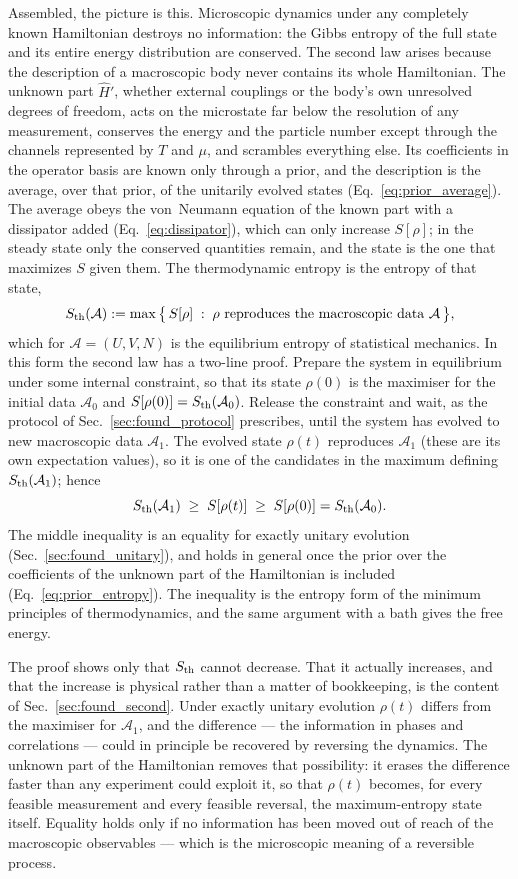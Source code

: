 \documentclass[10pt,a4paper]{article}
\begin{document}
Assembled, the picture is this.
Microscopic dynamics under any completely known Hamiltonian destroys no information: the Gibbs entropy of the full state and its entire energy distribution are conserved.
The second law arises because the description of a macroscopic body never contains its whole Hamiltonian.
The unknown part $ \hat H' $, whether external couplings or the body's own unresolved degrees of freedom, acts on the microstate far below the resolution of any measurement, conserves the energy and the particle number except through the channels represented by $ T $ and $ \mu $, and scrambles everything else.
Its coefficients in the operator basis are known only through a prior, and the description is the average, over that prior, of the unitarily evolved states (Eq.~\eqref{eq:prior_average}).
The average obeys the von~Neumann equation of the known part with a dissipator added (Eq.~\eqref{eq:dissipator}), which can only increase $ S[\rho] $; in the steady state only the conserved quantities remain, and the state is the one that maximizes $ S $ given them.
The thermodynamic entropy is the entropy of that state,
\[
  S_{\rm th}(\mathcal{A}) := \max\big\{\,S[\rho] \;:\; \rho \text{ reproduces the macroscopic data } \mathcal{A}\,\big\} ,
\]
which for $ \mathcal{A} = (U, V, N) $ is the equilibrium entropy of statistical mechanics.
In this form the second law has a two-line proof.
Prepare the system in equilibrium under some internal constraint, so that its state $ \rho(0) $ is the maximiser for the initial data $ \mathcal{A}_0 $ and $ S[\rho(0)] = S_{\rm th}(\mathcal{A}_0) $.
Release the constraint and wait, as the protocol of Sec.~\ref{sec:found_protocol} prescribes, until the system has evolved to new macroscopic data $ \mathcal{A}_1 $.
The evolved state $ \rho(t) $ reproduces $ \mathcal{A}_1 $ (these are its own expectation values), so it is one of the candidates in the maximum defining $ S_{\rm th}(\mathcal{A}_1) $; hence
\[
  S_{\rm th}(\mathcal{A}_1) \;\geq\; S[\rho(t)] \;\geq\; S[\rho(0)] = S_{\rm th}(\mathcal{A}_0) .
\]
The middle inequality is an equality for exactly unitary evolution (Sec.~\ref{sec:found_unitary}), and holds in general once the prior over the coefficients of the unknown part of the Hamiltonian is included (Eq.~\eqref{eq:prior_entropy}).
The inequality is the entropy form of the minimum principles of thermodynamics, and the same argument with a bath gives the free energy.

The proof shows only that $ S_{\rm th} $ cannot decrease.
That it actually increases, and that the increase is physical rather than a matter of bookkeeping, is the content of Sec.~\ref{sec:found_second}.
Under exactly unitary evolution $ \rho(t) $ differs from the maximiser for $ \mathcal{A}_1 $, and the difference --- the information in phases and correlations --- could in principle be recovered by reversing the dynamics.
The unknown part of the Hamiltonian removes that possibility: it erases the difference faster than any experiment could exploit it, so that $ \rho(t) $ becomes, for every feasible measurement and every feasible reversal, the maximum-entropy state itself.
Equality holds only if no information has been moved out of reach of the macroscopic observables --- which is the microscopic meaning of a reversible process.
\end{document}

